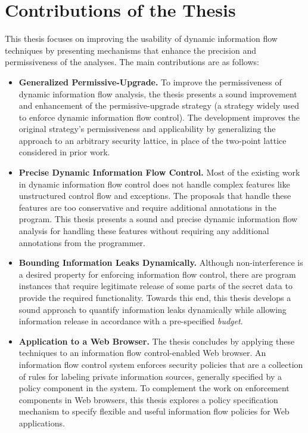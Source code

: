 \section{Contributions of the Thesis}
This thesis focuses on improving the usability of dynamic information
flow techniques by presenting mechanisms that enhance the precision
and permissiveness of the analyses. The main contributions are as
follows: 
\begin{itemize}
\item \textbf{Generalized Permissive-Upgrade.} To improve the
    permissiveness of dynamic information flow analysis, the thesis 
    presents a sound improvement and enhancement of the
    permissive-upgrade strategy (a strategy widely used to enforce
    dynamic information flow control). The development improves the
    original strategy's permissiveness and applicability by
    generalizing the approach to an arbitrary security lattice, in
    place of the two-point lattice considered in prior work. 
\item \textbf{Precise Dynamic Information Flow Control.} Most of the
  existing work in dynamic information flow control does not handle
  complex features like unstructured control flow and exceptions. The
  proposals that handle these features are too conservative and
  require additional annotations in the program. This thesis presents a
  sound and precise dynamic information flow analysis for handling
  these features without requiring any additional annotations from the
  programmer. 
\item \textbf{Bounding Information Leaks Dynamically.} Although
  non-interference is a desired property for enforcing information
  flow control, there are program instances that  require legitimate
  release of some parts of the secret data to provide the required
  functionality. Towards this end, this thesis develops a sound
  approach to quantify information leaks dynamically while allowing
  information release in accordance with a pre-specified \emph{budget}. 
\item \textbf{Application to a Web Browser.} The thesis concludes by
  applying these techniques to an information flow control-enabled Web
  browser. An information flow control system enforces security
  policies that are a collection of rules for labeling private
  information sources, generally specified by a policy component in
  the system. To complement the work on enforcement components in Web
  browsers, this thesis explores a policy specification mechanism
  to specify flexible and useful information flow policies for Web applications. 
\end{itemize}
 
